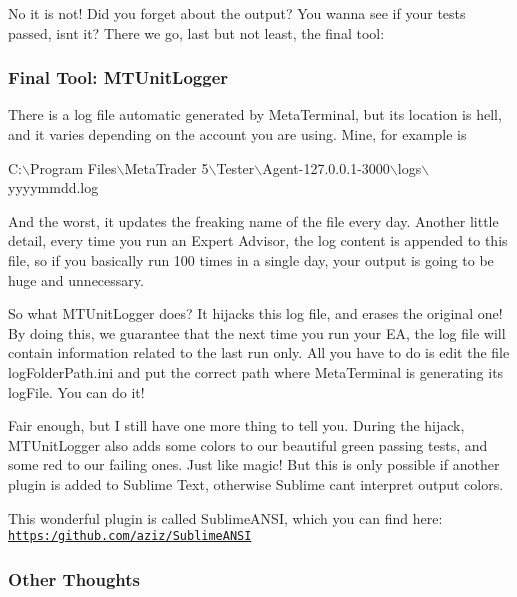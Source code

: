 No it is not! Did you forget about the output? You wanna see if your tests passed, isn\textquotesingle{}t it? There we go, last but not least, the final tool\+:

\subsubsection*{Final Tool\+: M\+T\+Unit\+Logger}

There is a log file automatic generated by Meta\+Terminal, but its location is hell, and it varies depending on the account you are using. Mine, for example is 
\begin{DoxyCode}
C:\(\backslash\)Program Files\(\backslash\)MetaTrader 5\(\backslash\)Tester\(\backslash\)Agent-127.0.0.1-3000\(\backslash\)logs\(\backslash\)yyyymmdd.log
\end{DoxyCode}
 And the worst, it updates the freaking name of the file every day. Another little detail, every time you run an Expert Advisor, the log content is appended to this file, so if you basically run 100 times in a single day, your output is going to be huge and unnecessary.

So what M\+T\+Unit\+Logger does? It hijacks this log file, and erases the original one! By doing this, we guarantee that the next time you run your EA, the log file will contain information related to the last run only. All you have to do is edit the file log\+Folder\+Path.\+ini and put the correct path where Meta\+Terminal is generating its log\+File. You can do it!

Fair enough, but I still have one more thing to tell you. During the hijack, M\+T\+Unit\+Logger also adds some colors to our beautiful green passing tests, and some red to our failing ones. Just like magic! But this is only possible if another plugin is added to Sublime Text, otherwise Sublime can\textquotesingle{}t interpret output colors.

This wonderful plugin is called Sublime\+A\+N\+SI, which you can find here\+: \href{https:/github.com/aziz/SublimeANSI}{\tt https\+:/github.\+com/aziz/\+Sublime\+A\+N\+SI}

\subsubsection*{Other Thoughts}

